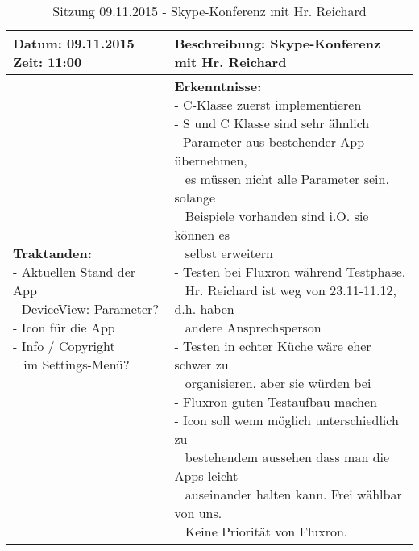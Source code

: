\begin{table}[H]
\begin{tabularx}{\textwidth}{| l | X |}
\hline
\textbf{Datum:} 09.11.2015
\textbf{Zeit:} 11:00
&
\textbf{Beschreibung:} Skype-Konferenz mit Hr. Reichard \\ \hline
\specialcell[t]{
\textbf{Traktanden:}\\
- Aktuellen Stand der App\\
- DeviceView: Parameter?\\
- Icon für die App\\
- Info / Copyright\\~ im Settings-Menü?\\
}
& 
\specialcell[t]{
\textbf{Erkenntnisse:}\\
- C-Klasse zuerst implementieren\\
- S und C Klasse sind sehr ähnlich\\
- Parameter aus bestehender App übernehmen,\\~ es müssen nicht alle Parameter sein, solange\\~ Beispiele vorhanden sind i.O. sie können es\\~ selbst erweitern\\
- Testen bei Fluxron während Testphase.\\~ Hr. Reichard ist weg von 23.11-11.12, d.h. haben\\~ andere Ansprechsperson\\
- Testen in echter Küche wäre eher schwer zu\\~ organisieren, aber sie würden bei\\ - Fluxron guten Testaufbau machen\\
- Icon soll wenn möglich unterschiedlich zu\\~ bestehendem aussehen dass man die Apps leicht\\~ auseinander halten kann. Frei wählbar von uns.\\~ Keine Priorität von Fluxron.\\
}
\\ \hline
\end{tabularx}
\caption{Sitzung 09.11.2015 - Skype-Konferenz mit Hr. Reichard}
\end{table}



